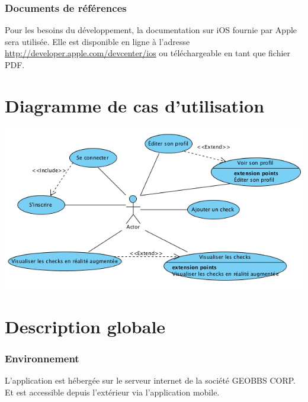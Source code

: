 \documentclass[a4paper,12pt]{report}
\begin{document}
\begin{onehalfspace}

\subsection{Documents de références} %
\label{ssub:documents_de_r_f_rences}

Pour les besoins du développement, la documentation sur iOS fournie par Apple sera utilisée. Elle est disponible en ligne à l'adresse \href{http://developer.apple.com/devcenter/ios/}{http://developer.apple.com/devcenter/ios} ou téléchargeable en tant que fichier PDF.


\chapter{Diagramme de cas d'utilisation}

\begin{center}
	\includegraphics[width=17cm]{img/diag_cas_utilisation.png}
\end{center}


\chapter{Description globale}

\subsection{Environnement} %
\label{sub:environnement}
L’application est hébergée sur le serveur internet de la société GEOBBS CORP. Et est accessible depuis l’extérieur via l'application mobile.



\end{onehalfspace}
\end{document}

